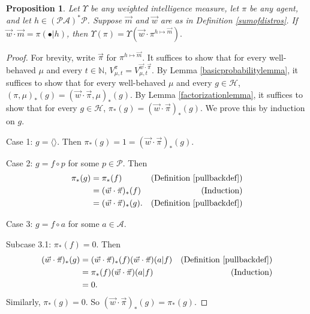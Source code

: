 \documentclass{article}
\newtheorem{proposition}[theorem]{Proposition}
\begin{document}
\begin{proposition}
\label{longproposition}
    Let $\Upsilon$ be any weighted intelligence measure, let $\pi$ be any agent,
    and let $h\in(\mathcal P\mathcal A)^*\mathcal P$.
    Suppose $\vec m$ and $\vec w$ are as in Definition \ref{sumofdistros}.
    If $\vec w\cdot\vec m = \pi(\bullet|h)$, then
    $
        \Upsilon(\pi)
        =
        \Upsilon(\vec w\cdot \pi^{h\mapsto \vec m}).
    $
\end{proposition}

\begin{proof}
    For brevity, write $\vec\pi$ for $\pi^{h\mapsto \vec m}$. It suffices to
    show that for every well-behaved $\mu$ and every $t\in\mathbb N$,
    $
        V^{\pi}_{\mu,t}
        =
        V^{\vec w\cdot \vec\pi}_{\mu,t}.
    $
    By Lemma \ref{basicprobabilitylemma}, it suffices to show that for every
    well-behaved $\mu$ and every $g\in\mathcal H$,
    $
    (\pi,\mu)_*(g)
    =
    (\vec w\cdot\vec\pi,\mu)_*(g)
    $.
    By Lemma \ref{factorizationlemma}, it suffices
    to show that for every $g\in\mathcal H$,
    $\pi_*(g)=(\vec w\cdot\vec\pi)_*(g)$.
    We prove this by induction on $g$.

    Case 1: $g=\langle\rangle$.
    Then $\pi_*(g)=1
    =(\vec w\cdot\vec\pi)_*(g)$.

    Case 2: $g=f\circ p$ for some $p\in\mathcal P$.
    Then
    \begin{align*}
        \pi_*(g)
            &= \pi_*(f)
                &\mbox{(Definition \ref{pullbackdef})}\\
            &= (\vec w\cdot\vec\pi)_*(f)
                &\mbox{(Induction)}\\
            &= (\vec w\cdot\vec\pi)_*(g).
                &\mbox{(Definition \ref{pullbackdef})}
    \end{align*}

    Case 3: $g=f\circ a$ for some $a\in\mathcal A$.

    Subcase 3.1: $\pi_*(f)=0$.
    Then
    \begin{align*}
        (\vec w\cdot\vec\pi)_*(g)
            &= (\vec w\cdot\vec\pi)_*(f)
            (\vec w\cdot\vec\pi)(a|f)
                &\mbox{(Definition \ref{pullbackdef})}\\
            &= \pi_*(f)(\vec w\cdot\vec\pi)(a|f)
                &\mbox{(Induction)}\\
            &= 0.
    \end{align*}
    Similarly, $\pi_*(g)=0$. So $(\vec w\cdot\vec\pi)_*(g)=\pi_*(g)$.


\end{proof}
\end{document}
